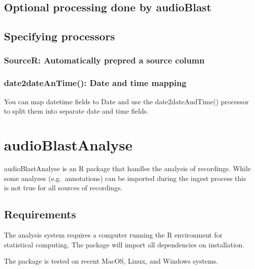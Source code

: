 \documentclass[
]{book}
\begin{document}
\hypertarget{optional-processing-done-by-audioblast}{%
\section{Optional processing done by audioBlast}\label{optional-processing-done-by-audioblast}}

\hypertarget{specifying-processors}{%
\section{Specifying processors}\label{specifying-processors}}

\hypertarget{sourcer-automatically-prepred-a-source-column}{%
\subsection{SourceR: Automatically prepred a source column}\label{sourcer-automatically-prepred-a-source-column}}

\hypertarget{date2dateantime-date-and-time-mapping}{%
\subsection{date2dateAnTime(): Date and time mapping}\label{date2dateantime-date-and-time-mapping}}

You can map datetime fields to Date and use the date2dateAndTime() processor to split them into separate date and time fields.

\hypertarget{audioblastanalyse}{%
\chapter{audioBlastAnalyse}\label{audioblastanalyse}}

audioBlastAnalyse is an R package that handles the analysis of recordings. While some analyses (e.g.~annotations) can be imported during the ingest process this is not true for all sources of recordings.

\hypertarget{requirements}{%
\section{Requirements}\label{requirements}}

The analysis system requires a computer running the R environment for statistical computing. The package will import all dependencies on installation.

The package is tested on recent MacOS, Linux, and Windows systems.
\end{document}
